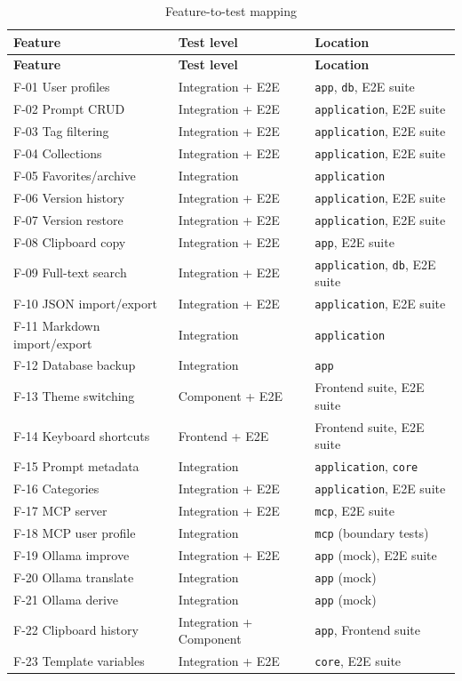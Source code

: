 \documentclass[a4paper, 11pt, oneside]{report}
\begin{document}
\begin{longtable}{l l l}
  \caption{Feature-to-test mapping}
  \label{tab:feature-test-map} \\
  \toprule
  \textbf{Feature} & \textbf{Test level} & \textbf{Location} \\
  \midrule
  \endfirsthead
  \toprule
  \textbf{Feature} & \textbf{Test level} & \textbf{Location} \\
  \midrule
  \endhead
  F-01 User profiles       & Integration + E2E & \texttt{app}, \texttt{db}, E2E suite \\
  F-02 Prompt CRUD         & Integration + E2E & \texttt{application}, E2E suite \\
  F-03 Tag filtering       & Integration + E2E & \texttt{application}, E2E suite \\
  F-04 Collections         & Integration + E2E & \texttt{application}, E2E suite \\
  F-05 Favorites/archive   & Integration       & \texttt{application} \\
  F-06 Version history     & Integration + E2E & \texttt{application}, E2E suite \\
  F-07 Version restore     & Integration + E2E & \texttt{application}, E2E suite \\
  F-08 Clipboard copy      & Integration + E2E & \texttt{app}, E2E suite \\
  F-09 Full-text search    & Integration + E2E & \texttt{application}, \texttt{db}, E2E suite \\
  F-10 JSON import/export  & Integration + E2E & \texttt{application}, E2E suite \\
  F-11 Markdown import/export & Integration    & \texttt{application} \\
  F-12 Database backup     & Integration       & \texttt{app} \\
  F-13 Theme switching     & Component + E2E   & Frontend suite, E2E suite \\
  F-14 Keyboard shortcuts  & Frontend + E2E    & Frontend suite, E2E suite \\
  F-15 Prompt metadata     & Integration       & \texttt{application}, \texttt{core} \\
  F-16 Categories          & Integration + E2E & \texttt{application}, E2E suite \\
  F-17 MCP server          & Integration + E2E & \texttt{mcp}, E2E suite \\
  F-18 MCP user profile    & Integration       & \texttt{mcp} (boundary tests) \\
  F-19 Ollama improve      & Integration + E2E & \texttt{app} (mock), E2E suite \\
  F-20 Ollama translate    & Integration       & \texttt{app} (mock) \\
  F-21 Ollama derive       & Integration       & \texttt{app} (mock) \\
  F-22 Clipboard history   & Integration + Component & \texttt{app}, Frontend suite \\
  F-23 Template variables  & Integration + E2E & \texttt{core}, E2E suite \\
  \bottomrule
\end{longtable}
\end{document}
